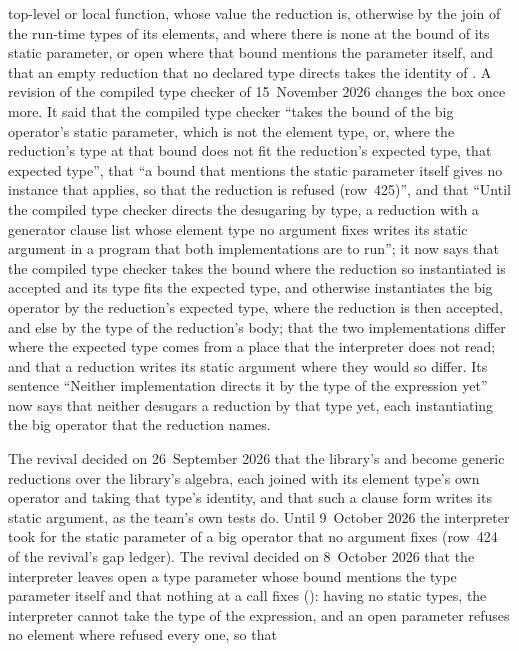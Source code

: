 \begin{description}
top-level or local function, whose value the reduction is, otherwise by the
join of the run-time types of its elements, and where
there is none at the bound of its static parameter, or open where that bound
mentions the parameter itself, and that an empty reduction that no declared
type directs takes the identity of .
A revision of the compiled type checker of 15~November 2026 changes the box
once more.
It said that the compiled type checker ``takes the bound of the big operator's
static parameter, which is not the element type, or, where the reduction's
type at that bound does not fit the reduction's expected type, that expected
type'', that ``a bound that mentions the static parameter itself gives no
instance that applies, so that the reduction is refused (row~425)'', and that
``Until the compiled type checker directs the desugaring by type, a reduction
with a generator clause list whose element type no argument fixes writes its
static argument in a program that both implementations are to run''; it now
says that the compiled type checker takes the bound where the reduction so
instantiated is accepted and its type fits the expected type, and otherwise
instantiates the big operator by the reduction's expected type, where the
reduction is then accepted, and else by the type of the reduction's body; that
the two implementations differ where the expected type comes from a place that
the interpreter does not read; and that a reduction writes its static argument
where they would so differ.
Its sentence ``Neither implementation directs it by the type  of the
expression yet'' now says that neither desugars a reduction by that type yet,
each instantiating the big operator that the reduction names.
\item[Rationale] The revival decided on 26~September 2026 that the library's
 and  become generic reductions over the library's algebra,
each joined with its element type's own operator and taking that type's
identity, and that such a clause form writes its static argument, as the team's
own tests do.
Until 9~October 2026 the interpreter took  for the static
parameter of a big operator that no argument fixes (row~424 of the revival's
gap ledger).
The revival decided on 8~October 2026 that the interpreter leaves open a type
parameter whose bound mentions the type parameter itself and that nothing at a
call fixes (): having no static types, the
interpreter cannot take the type  of the expression, and an open
parameter refuses no element where  refused every one, so that

\end{description}
